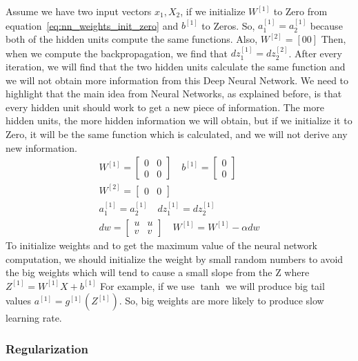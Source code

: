 Assume  we have two input vectors $x_1,X_2$, if we initialize $W^{[1]}$ to Zero from equation~\eqref{eq:nn_weights_init_zero} and $b^{[1]}$ to Zeros. So, $a_1^{[1]}=a_2^{[1]}$ because both of the hidden units compute the same functions. Also, $W^{[2]}=[0 0]$ Then, when we compute the backpropagation, we find that $dz_1^{[1]}=dz_2^{[2]}$. After every iteration, we will find that the two hidden units calculate the same function and we will not obtain more information from this Deep Neural Network. We need to highlight that the main idea from Neural Networks, as explained before, is that every hidden unit should work to get a new piece of information. The more hidden units, the more hidden information we will obtain, but if we initialize it to Zero, it will be the same function which is calculated, and we will not derive any new information.%
%
\begin{subequations}\label{eq:nn_weights_init_zero}
\begin{align}
 W^{[1]} = \begin{bmatrix} 0 & 0\\ 0 & 0 \end{bmatrix} \quad b^{[1]} = \begin{bmatrix} 0 \\ 0 \end{bmatrix} \\
 W^{[2]} = \begin{bmatrix} 0 & 0 \end{bmatrix} \\
 a_1^{[1]} = a_2^{[1]} \quad   dz_1^{[1]} = dz_2^{[1]}\\
 dw = \begin{bmatrix} u & u \\ v & v \end{bmatrix} \quad W^{[1]} = W^{[1]} - \alpha dw
\end{align}
\end{subequations}%
%
To initialize weights and to get the maximum value of the neural network computation, we should initialize the weight by small random numbers to avoid the big weights which will tend to cause a small slope from the Z where $Z^{[1]}= W^{[1]} X + b^{[1]}$ For example, if we use $\tanh$ we will produce big tail values $a^{[1]}= g^{[1]}(Z^{[1]})$. So, big weights are more likely to produce slow learning rate. 

\subsubsection{Regularization}

